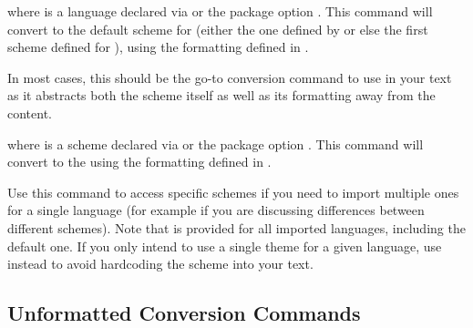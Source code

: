 \documentclass{ltxdockit}
\begin{document}
\begin{ltxsyntax}

where  is a language declared via
 or the package option .
This command will convert  to the default scheme for 
(either the one defined by  or else the first scheme
defined for ), using the formatting defined in
.

In most cases, this should be the go-to conversion command to use in your text
as it abstracts both the scheme itself as well as its formatting away from the
content.


where  is a scheme declared via
 or the package option .
This command will convert  to the  using the formatting
defined in .

Use this command to access specific schemes if you need to import multiple
ones for a single language (for example if you are discussing differences
between different schemes). Note that  is
provided for all imported languages, including the default one. If you only
intend to use a single theme for a given language, use
 instead to avoid hardcoding the scheme into your
text.

\end{ltxsyntax}

\subsection{Unformatted Conversion Commands}
\end{document}
